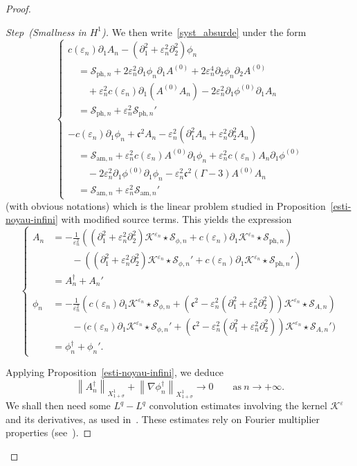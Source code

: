 \documentclass[10pt]{amsart}
\theoremstyle{definition}\newtheorem{defi}[theo]{Definition}\newtheorem{rema}[theo]{Remark}\newtheorem{exam}[theo]{Example}\newtheorem{exem}[theo]{Example}\newtheorem{nota}[theo]{Notation}
\newcommand*\p{\partial}
\newcommand{\amm}{\mathrm{am}}
\newcommand{\phl}{\mathrm{ph}}
\newcommand*\BK{\mathcal{K}}
\newcommand*\BS{\mathcal{S}}
\newcommand*\ds{\displaystyle}
\newcommand*\cs{{\mathfrak c}}
\newcommand*\ii{\infty}
\newcommand*\e{\varepsilon}
\newcommand*\s{\sigma}
\newcounter{stepcount}
\newenvironment{step}[1]{\refstepcounter{stepcount}\begin{proof}[{Step~\thestepcount}{\;(#1)}]}{\let\qed\relax\end{proof}}
\begin{document}
\begin{proof}
\begin{step}{{Smallness in $ H^1 $}}
We then write~\eqref{syst_absurde} under the form
\begin{equation*}
\left\{
\begin{array}{ll}
c(\e_n) \p_{1} A_n - \left(\p_{1}^2 + \e_n^2 \p^2_{2}\right) \phi_n
\\
\quad = \BS_{{\phl},n} + 2 \e_n^2 \p_{1} \phi_n \p_{1} A^{(0)} + 2 \e_n^4 \p_{2} \phi_n \p_{2} A^{(0)}
\\
\qquad + \e_n^2 c(\e_n) \p_1 \left(A^{(0)} A_n\right) - 2 \e_n^2 \p_{1} \phi^{(0)} \p_{1} A_n
\\
\quad = \BS_{{\phl},n} + \e_n^2 \BS_{{\phl},n}'
\\ \ \\
- c(\e_n) \p_{1} \phi_n + \cs^2 A_n - \e_n^2 \left(\p_{1}^2 A_n + \e_n^2 \p_{2}^2 A_n\right)
\\
\quad = \BS_{{\amm},n} + \e_n^2 c(\e_n) A^{(0)} \p_1 \phi_n + \e_n^2 c(\e_n) A_n \p_1 \phi^{(0)}
\\
\qquad- 2 \e_n^2 \p_{1} \phi^{(0)} \p_{1} \phi_n - \e_n^2 \cs^2 (\Gamma -3) A^{(0)} A_n
\\
\quad = \BS_{{\amm},n} + \e_n^2 \BS_{{\amm},n}'
\end{array}\right.
\end{equation*}
(with obvious notations) which is the linear problem studied in Proposition~\ref{esti-noyau-infini} with modified source terms. This yields the expression
\[
\left\{
\begin{array}{ll}
 A_n &= \ds{- \frac{1}{\e_n^2} \left(\left(\p_1^2 + \e_n^2 \p_2^2\right) \BK^{\e_n} \star \BS_{\phi,n} + c(\e_n) \p_1 \BK^{\e_n} \star \BS_{{\phl},n} \right)} 
\\ &\qquad - \left(\left(\p_1^2 + \e_n^2 \p_2^2\right) \BK^{\e_n} \star \BS_{\phi,n}' + c(\e_n) \p_1 \BK^{\e_n} \star \BS_{{\phl},n}' \right)
\\ &= A_n^\dag + A_n'
\\ \ \\
\phi_n &=\ds{ - \frac{1}{\e_n^2} \left(c(\e_n) \p_1 \BK^{\e_n} \star \BS_{\phi,n} + \left(\cs^2 - \e_n^2 \left(\p_1^2 + \e_n^2 \p_2^2\right)\right) \BK^{\e_n} \star \BS_{ A, n} \right)}
\\ &\qquad - \big(c(\e_n) \p_1 \BK^{\e_n} \star \BS_{\phi,n}' + (\cs^2 - \e_n^2 (\p_1^2 + \e_n^2 \p_2^2)) \BK^{\e_n} \star \BS_{A, n}' \big)\\
&= \phi_n^\dag + \phi_n'.
\end{array}\right.
\]

Applying Proposition~\ref{esti-noyau-infini}, we deduce
\begin{equation}\label{apriori_26}
\left\| A_n^\dag \right\|_{X^1_{1+\s}} + \left\| \nabla \phi_n^\dag \right\|_{X^1_{1+\s}} \to 0
\qquad \text{as} \ n \to +\ii.
\end{equation} We shall then need some $ L^q-L^q $ convolution estimates involving the kernel $ \BK^\e $ and its derivatives, as used in~\cite[Lemma~5.2]{BGStranso2d}. These estimates rely on Fourier multiplier properties (see~\cite{Liz,Mus-Pip-Tao-Thi}).




\end{step}
\end{proof}
\end{document}
